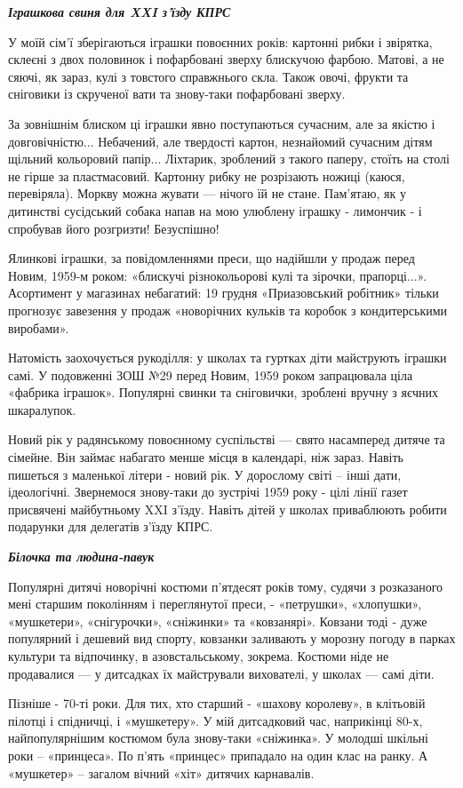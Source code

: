 \textbf{\emph{Іграшкова свиня для XXI з'їзду КПРС}}

У моїй сім'ї зберігаються іграшки повоєнних років: картонні рибки і звірятка,
склеєні з двох половинок і пофарбовані зверху блискучою фарбою. Матові, а не
сяючі, як зараз, кулі з товстого справжнього скла. Також овочі, фрукти та
сніговики із скрученої вати та знову-таки пофарбовані зверху.

За зовнішнім блиском ці іграшки явно поступаються сучасним, але за якістю і
довговічністю... Небачений, але твердості картон, незнайомий сучасним дітям
щільний кольоровий папір... Ліхтарик, зроблений з такого паперу, стоїть на
столі не гірше за пластмасовий. Картонну рибку не розрізають ножиці (каюся,
перевіряла). Моркву можна жувати — нічого їй не стане. Пам'ятаю, як у дитинстві
сусідський собака напав на мою улюблену іграшку - лимончик - і спробував його
розгризти! Безуспішно!

Ялинкові іграшки, за повідомленнями преси, що надійшли у продаж перед Новим,
1959-м роком: «блискучі різнокольорові кулі та зірочки, прапорці...».
Асортимент у магазинах небагатий: 19 грудня «Приазовський робітник» тільки
прогнозує завезення у продаж «новорічних кульків та коробок з кондитерськими
виробами».

Натомість заохочується рукоділля: у школах та гуртках діти майструють іграшки
самі. У подовженні ЗОШ №29 перед Новим, 1959 роком запрацювала ціла «фабрика
іграшок». Популярні свинки та сніговички, зроблені вручну з яєчних шкаралупок.

Новий рік у радянському повоєнному суспільстві — свято насамперед дитяче та
сімейне. Він займає набагато менше місця в календарі, ніж зараз. Навіть
пишеться з маленької літери - новий рік. У дорослому світі – інші дати,
ідеологічні. Звернемося знову-таки до зустрічі 1959 року - цілі лінії газет
присвячені майбутньому XXI з'їзду. Навіть дітей у школах приваблюють робити
подарунки для делегатів з'їзду КПРС.

\textbf{\emph{Білочка та людина-павук}}

Популярні дитячі новорічні костюми п'ятдесят років тому, судячи з розказаного
мені старшим поколінням і переглянутої преси, - «петрушки», «хлопушки»,
«мушкетери», «снігурочки», «сніжинки» та «ковзанярі». Ковзани тоді - дуже
популярний і дешевий вид спорту, ковзанки заливають у морозну погоду в парках
культури та відпочинку, в азовстальському, зокрема. Костюми ніде не продавалися
— у дитсадках їх майстрували вихователі, у школах — самі діти.

Пізніше - 70-ті роки. Для тих, хто старший - «шахову королеву», в клітьовій
пілотці і спідничці, і «мушкетеру». У мій дитсадковий час, наприкінці 80-х,
найпопулярнішим костюмом була знову-таки «сніжинка». У молодші шкільні роки –
«принцеса». По п'ять «принцес» припадало на один клас на ранку. А «мушкетер» –
загалом вічний «хіт» дитячих карнавалів.

